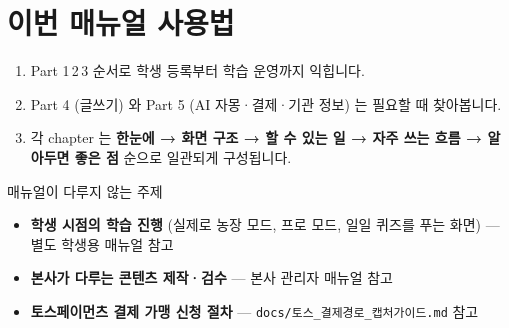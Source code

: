 \section*{이번 매뉴얼 사용법}

\begin{enumerate}
  \item Part 1\,2\,3 순서로 학생 등록부터 학습 운영까지 익힙니다.
  \item Part 4 (글쓰기) 와 Part 5 (AI 자몽·결제·기관 정보) 는 필요할 때 찾아봅니다.
  \item 각 chapter 는 \textbf{한눈에 → 화면 구조 → 할 수 있는 일 → 자주 쓰는 흐름 → 알아두면 좋은 점} 순으로 일관되게 구성됩니다.
\end{enumerate}

\begin{tipbox}{매뉴얼이 다루지 않는 주제}
\begin{itemize}[leftmargin=1.2em]
  \item \textbf{학생 시점의 학습 진행} (실제로 농장 모드, 프로 모드, 일일 퀴즈를 푸는 화면) — 별도 학생용 매뉴얼 참고
  \item \textbf{본사가 다루는 콘텐츠 제작·검수} — 본사 관리자 매뉴얼 참고
  \item \textbf{토스페이먼츠 결제 가맹 신청 절차} — \texttt{docs/토스\_결제경로\_캡처가이드.md} 참고
\end{itemize}
\end{tipbox}
